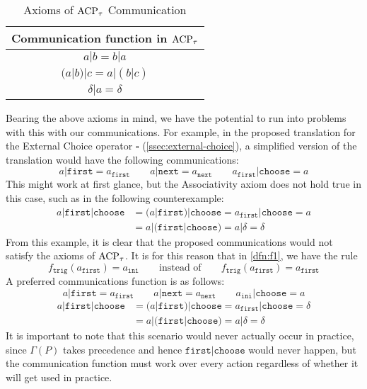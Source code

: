 \documentclass[../hons_project.tex]{subfiles}
\begin{document}
\begin{table}[h!]
	\centering
	\begin{tabular}{ |c| }
		\hline
		\textbf{Communication function in $\mathrm{ACP}_{\tau}$} \\
		\hline
		$a | b = b | a$                            \\
		$(a | b) | c = a | (b | c)$                \\
		$\delta | a = \delta$                      \\
		\hline
	\end{tabular}
	\caption{Axioms of $\mathrm{ACP}_{\tau}$ Communication}
	\label{table:acpt-communication}
\end{table}

Bearing the above axioms in mind, we have the potential to run into problems with this with our communications. For example, in the proposed translation for the External Choice operator $\square$ (\ref{ssec:external-choice}), a simplified version of the translation would have the following communications:
\[a | \mathtt{first} = a_{\mathtt{first}} \qquad a | \mathtt{next} = a_{\mathtt{next}} \qquad a_{\mathtt{first}} | \mathtt{choose} = a\]
This might work at first glance, but the Associativity axiom does not hold true in this case, such as in the following counterexample:
\begin{align*}
	a | \mathtt{first} | \mathtt{choose} & = (a | \mathtt{first}) | \mathtt{choose} = a_{\mathtt{first}} | \mathtt{choose} = a \\
	                                     & = a | (\mathtt{first} | \mathtt{choose}) = a | \delta = \delta
\end{align*}
From this example, it is clear that the proposed communications would not satisfy the axioms of $\mathrm{ACP}_{\tau}$. It is for this reason that in \ref{dfn:f1}, we have the rule
\[f_{\mathtt{trig}}(a_{\mathtt{first}}) = a_{\mathtt{ini}} \qquad \text{instead of} \qquad f_{\mathtt{trig}}(a_{\mathtt{first}}) = a_{\mathtt{first}}\]
A preferred communications function is as follows:
\[a | \mathtt{first} = a_{\mathtt{first}} \qquad a | \mathtt{next} = a_{\mathtt{next}} \qquad a_{\mathtt{ini}} | \mathtt{choose} = a\]
\begin{align*}
	a | \mathtt{first} | \mathtt{choose} & = (a | \mathtt{first}) | \mathtt{choose} = a_{\mathtt{first}} | \mathtt{choose} = \delta \\
	                                     & = a | (\mathtt{first} | \mathtt{choose}) = a | \delta = \delta
\end{align*}
It is important to note that this scenario would never actually occur in practice, since $\Gamma(P)$ takes precedence and hence $\mathtt{first} | \mathtt{choose}$ would never happen, but the communication function must work over every action regardless of whether it will get used in practice.
\end{document}
